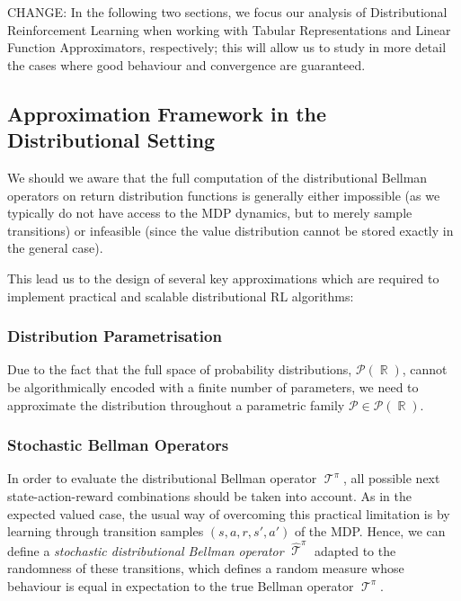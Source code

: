 \documentclass[12pt,a4paper,openright,twoside]{article}
\DeclareMathOperator*{\R}{\mathbb{R}}
\DeclareMathOperator*{\T}{\mathcal{T}}
\DeclareMathOperator{\Ppi}{\textbf{P}^\pi}
\numberwithin{equation}{section}
\theoremstyle{definition}
\theoremstyle{remark}
\theoremstyle{plain}
\begin{document}
CHANGE: In the following two sections, we focus our analysis of Distributional Reinforcement Learning when working with Tabular Representations and Linear Function Approximators, respectively; this will allow us to study in more detail the cases where good behaviour and convergence are guaranteed.



\subsection{Approximation Framework in the Distributional Setting}

We should we aware that the full computation of the distributional Bellman operators on return distribution functions is generally either impossible (as we typically do not have access to the MDP dynamics, but to merely sample transitions) or infeasible (since the value distribution cannot be stored exactly in the general case).

This lead us to the design of several key approximations which are required to implement practical and scalable distributional RL algorithms\cite{analysisC51}:

\subsubsection{Distribution Parametrisation}
Due to the fact that the full space of probability distributions, $\mathscr{P}(\R)$, cannot be algorithmically encoded with a finite number of parameters, we need to approximate the distribution throughout a parametric family $\mathcal{P} \in \mathscr{P}(\R)$.

\subsubsection{Stochastic Bellman Operators}
In order to evaluate the distributional Bellman operator $\T^\pi$, all possible next state-action-reward combinations should be taken into account. As in the expected valued case, the usual way of overcoming this practical limitation is by learning through transition samples $(s,a,r,s',a')$ of the MDP. Hence, we can define a \textit{stochastic distributional Bellman operator} $\widehat{\T}^\pi$ adapted to the randomness of these transitions, which defines a random measure whose behaviour is equal in expectation to the true Bellman operator $\T^\pi$.
\end{document}
